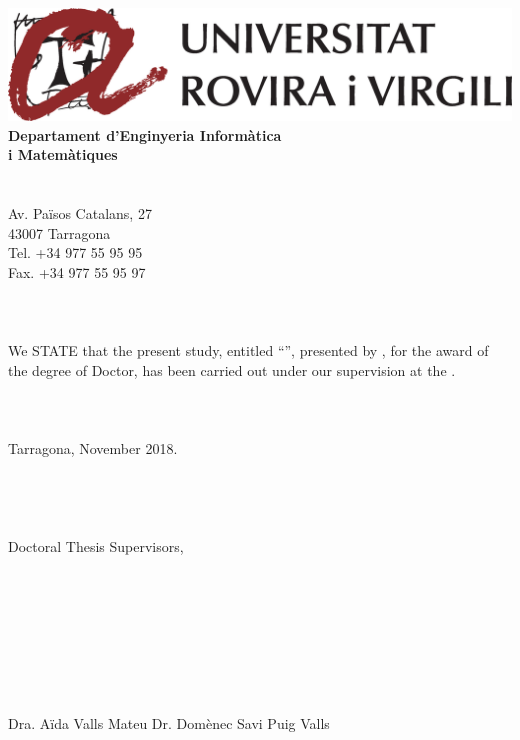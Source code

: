 \documentclass[
11pt, %
english, %
singlespacing, %
headsepline, %
]{MastersDoctoralThesis} %
\theoremstyle{definition}
\theoremstyle{definition} %
\theoremstyle{remark}
\begin{document}
\includegraphics[height=2.0\baselineskip]{Figures/urv/urv-bandera-color}\\
\textbf{Departament d'Enginyeria Inform\`atica}\\
\textbf{i Matem\`atiques}\\
\\
\\
Av. Pa\"isos Catalans, 27\\
43007 Tarragona\\
Tel. +34 977 55 95 95\\
Fax. +34 977 55 95 97\\
\\
\\
\\
We STATE that the present study, entitled \enquote{\ttitle}, presented by \authorname, for the award of the degree of Doctor, has been carried out under our supervision at the \deptname.\\
\\
\\
\\
Tarragona, November 2018.\\
\\
\\
\\
\\
Doctoral Thesis Supervisors,\\
\\
\\
\\
\\
\\
\\
\\
\\

Dra. A\"ida Valls Mateu \hspace{40pt} Dr. Dom\`enec Savi Puig Valls

\cleardoublepage


\end{document}
